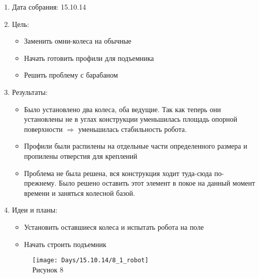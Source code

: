 
	\begin{enumerate}
	\item Дата собрания: 15.10.14
	\item Цель:
		\begin{itemize}
		\item Заменить омни-колеса на обычные
		\item Начать готовить профили для подъемника
		\item Решить проблему с барабаном
		\end{itemize}
	\item Результаты:
		\begin{itemize}
		\item Было установлено два колеса, оба ведущие. Так как теперь они установлены не в углах конструкции уменьшилась площадь опорной поверхности $\Rightarrow$ уменьшилась стабильность робота.
		\item Профили были распилены на отдельные части определенного размера и пропилены отверстия для креплений
		\item Проблема не была решена, вся конструкция ходит туда-сюда по-прежнему. Было решено оставить этот элемент в покое на данный момент времени и заняться колесной базой.
		\end{itemize}
	\item Идеи и планы:
		\begin{itemize}
		\item Установить оставшиеся колеса и испытать робота на поле
		\item Начать строить подъемник
		\end{itemize}
		\begin{figure} [h]
			\centering
			\begin{minipage}{0.3\linewidth}
				\texttt{[image: Days/15.10.14/8\_1\_robot]}\\ Рисунок 8
			\end{minipage}
		\end{figure}
	\end{enumerate}
\fillpage
\newpage

